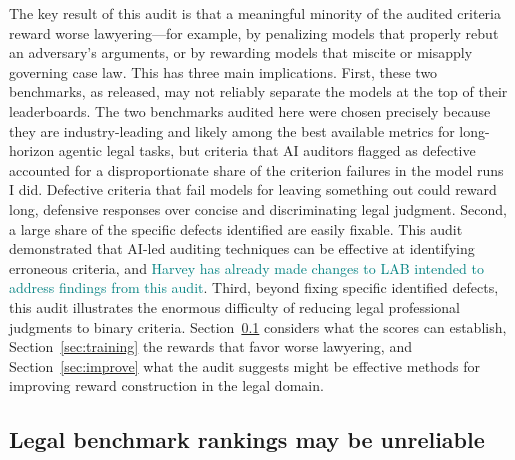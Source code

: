 \documentclass[11pt]{article}
\newcommand{\pending}[1]{\textcolor{teal}{#1}}
\begin{document}
The key result of this audit is that a meaningful minority of the audited criteria reward worse lawyering---for example, by penalizing models that properly rebut an adversary's arguments, or by rewarding models that miscite or misapply governing case law. This has three main implications. First, these two benchmarks, as released, may not reliably separate the models at the top of their leaderboards. The two benchmarks audited here were chosen precisely because they are industry-leading and likely among the best available metrics for long-horizon agentic legal tasks, but criteria that AI auditors flagged as defective accounted for a disproportionate share of the criterion failures in the model runs I did. Defective criteria that fail models for leaving something out could reward long, defensive responses over concise and discriminating legal judgment. Second, a large share of the specific defects identified are easily fixable. This audit demonstrated that AI-led auditing techniques can be effective at identifying erroneous criteria, and \pending{Harvey has already made changes to LAB intended to address findings from this audit}. Third, beyond fixing specific identified defects, this audit illustrates the enormous difficulty of reducing legal professional judgments to binary criteria. Section~\ref{sec:scores} considers what the scores can establish, Section~\ref{sec:training} the rewards that favor worse lawyering, and Section~\ref{sec:improve} what the audit suggests might be effective methods for improving reward construction in the legal domain.

\subsection{Legal benchmark rankings may be unreliable}
\label{sec:scores}
\end{document}
